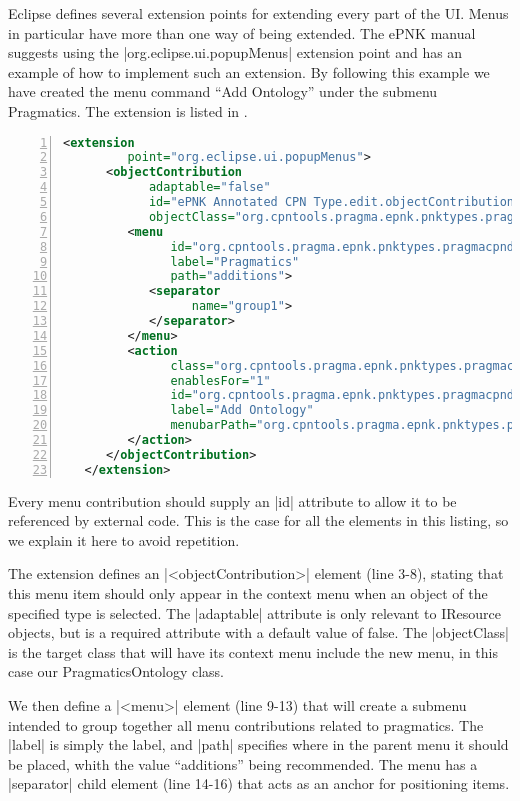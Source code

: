 Eclipse defines several extension points for extending every part of the UI.
Menus in particular have more than one way of being extended. The ePNK manual
suggests using the |org.eclipse.ui.popupMenus| extension point and has an
example of how to implement such an extension. By following this example we have
created the menu command ``Add Ontology'' under the submenu Pragmatics. The
extension is listed in . 

\begin{lstlisting}[language=XML,float,label=lst:addOntologyMenu,numbers=left,stepnumber=5,
caption=Add Ontology Menu Extension]
   <extension
         point="org.eclipse.ui.popupMenus">
      <objectContribution
            adaptable="false"
            id="ePNK Annotated CPN Type.edit.objectContribution1"
            objectClass="org.cpntools.pragma.epnk.pnktypes.pragmacpndefinition.PragmaticsOntology">
         <menu
               id="org.cpntools.pragma.epnk.pnktypes.pragmacpndefinition.actions.standardmenu"
               label="Pragmatics"
               path="additions">
            <separator
                  name="group1">
            </separator>
         </menu>
         <action
               class="org.cpntools.pragma.epnk.pnktypes.pragmacpndefinition.menu.AddOntologyAction"
               enablesFor="1"
               id="org.cpntools.pragma.epnk.pnktypes.pragmacpndefinition.actions.AddOntologyAction"
               label="Add Ontology"
               menubarPath="org.cpntools.pragma.epnk.pnktypes.pragmacpndefinition.actions.standardmenu/group1">
         </action>
      </objectContribution>
   </extension>
\end{lstlisting}

Every menu contribution should supply an |id| attribute to allow it to be
referenced by external code. This is the case for all the elements in this
listing, so we explain it here to avoid repetition.

The extension defines an
|<objectContribution>| element (line 3-8), stating that this menu item should
only appear in the context menu when an object of the specified type is selected. The
|adaptable| attribute is only relevant to IResource objects, but is a required
attribute with a default value of false. The |objectClass| is the
target class that will have its context menu include the new menu, in this case
our PragmaticsOntology class.

We then define a |<menu>| element (line 9-13) that will create a submenu
intended to group together all menu contributions related to pragmatics. The
|label| is simply the label, and |path| specifies where in the parent menu it
should be placed, whith the value ``additions'' being recommended. The menu has
a |separator| child element (line 14-16) that acts as an anchor for positioning
items.

